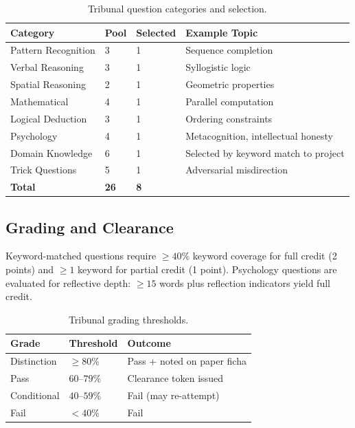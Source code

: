 \documentclass[11pt,a4paper]{article}
\theoremstyle{plain}
\theoremstyle{definition}
\theoremstyle{remark}
\begin{document}
\begin{table}[ht]
\centering
\caption{Tribunal question categories and selection.}
\label{tab:tribunal}
\begin{tabular}{@{}llll@{}}
\toprule
\textbf{Category} & \textbf{Pool} & \textbf{Selected} & \textbf{Example Topic} \\
\midrule
Pattern Recognition & 3 & 1 & Sequence completion \\
Verbal Reasoning    & 3 & 1 & Syllogistic logic \\
Spatial Reasoning   & 2 & 1 & Geometric properties \\
Mathematical        & 4 & 1 & Parallel computation \\
Logical Deduction   & 3 & 1 & Ordering constraints \\
Psychology          & 4 & 1 & Metacognition, intellectual honesty \\
Domain Knowledge    & 6 & 1 & Selected by keyword match to project \\
Trick Questions     & 5 & 1 & Adversarial misdirection \\
\midrule
\textbf{Total} & \textbf{26} & \textbf{8} & \\
\bottomrule
\end{tabular}
\end{table}

\subsection{Grading and Clearance}

Keyword-matched questions require $\geq 40\%$ keyword coverage for full credit (2 points) and
$\geq 1$ keyword for partial credit (1 point).  Psychology questions are evaluated for reflective
depth: $\geq 15$ words plus reflection indicators yield full credit.

\begin{table}[ht]
\centering
\caption{Tribunal grading thresholds.}
\label{tab:grades}
\begin{tabular}{@{}lll@{}}
\toprule
\textbf{Grade} & \textbf{Threshold} & \textbf{Outcome} \\
\midrule
Distinction   & $\geq 80\%$  & Pass + noted on paper ficha \\
Pass          & $60$--$79\%$ & Clearance token issued \\
Conditional   & $40$--$59\%$ & Fail (may re-attempt) \\
Fail          & $< 40\%$     & Fail \\
\bottomrule
\end{tabular}
\end{table}
\end{document}
